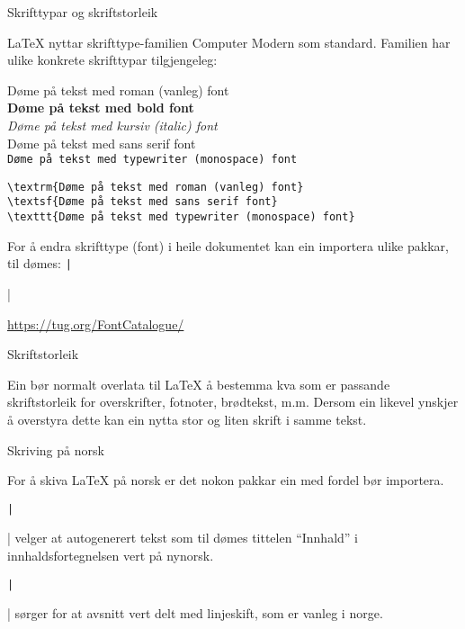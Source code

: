 \begin{frame}[containsverbatim]{Skrifttypar og skriftstorleik}
	
\LaTeX{} nyttar skrifttype-familien Computer Modern som standard. Familien har ulike konkrete skrifttypar tilgjengeleg:
	
\textrm{Døme på tekst med roman (vanleg) font}\\
\textbf{Døme på tekst med bold font}\\
\textit{Døme på tekst med kursiv (italic) font}\\
\textsf{Døme på tekst med sans serif font}\\
\texttt{Døme på tekst med typewriter (monospace) font}

	\begin{verbatim}
\textrm{Døme på tekst med roman (vanleg) font}
\textsf{Døme på tekst med sans serif font}
\texttt{Døme på tekst med typewriter (monospace) font}
	\end{verbatim}
	
	For å endra skrifttype (font) i heile dokumentet kan ein importera ulike pakkar, til dømes: \texttt|\usepackage{tgbonum}|
	
	\url{https://tug.org/FontCatalogue/}
	
	
\end{frame}


\begin{frame}[containsverbatim]{Skriftstorleik}
	
Ein bør normalt overlata til \LaTeX{} å bestemma kva som er passande skriftstorleik for overskrifter, fotnoter, brødtekst, m.m. Dersom ein likevel ynskjer å overstyra dette kan ein nytta {\huge stor} og {\tiny liten} skrift i samme tekst.
	
	
\end{frame}

\begin{frame}{Skriving på norsk}
	
	For å skiva \LaTeX{} på norsk er det nokon pakkar ein med fordel bør importera.
	
	\texttt|\usepackage[nynorsk]{babel}| velger at autogenerert tekst som til dømes tittelen ``Innhald'' i innhaldsfortegnelsen vert på nynorsk.
	
	\texttt|\usepackage{parskip}| sørger for at avsnitt vert delt med linjeskift, som er vanleg i norge.
	
\end{frame}


